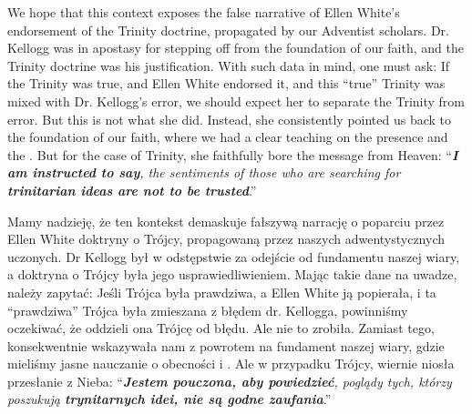 We hope that this context exposes the false narrative of Ellen White's endorsement of the Trinity doctrine, propagated by our Adventist scholars. Dr. Kellogg was in apostasy for stepping off from the foundation of our faith, and the Trinity doctrine was his justification. With such data in mind, one must ask: If the Trinity was true, and Ellen White endorsed it, and this “true” Trinity was mixed with Dr. Kellogg's error, we should expect her to separate the Trinity from error. But this is not what she did. Instead, she consistently pointed us back to the foundation of our faith, where we had a clear teaching on the presence and the . But for the case of Trinity, she faithfully bore the message from Heaven: “\textit{\textbf{I am instructed to say}, the sentiments of those who are searching for \textbf{trinitarian ideas are not to be trusted}}.”


Mamy nadzieję, że ten kontekst demaskuje fałszywą narrację o poparciu przez Ellen White doktryny o Trójcy, propagowaną przez naszych adwentystycznych uczonych. Dr Kellogg był w odstępstwie za odejście od fundamentu naszej wiary, a doktryna o Trójcy była jego usprawiedliwieniem. Mając takie dane na uwadze, należy zapytać: Jeśli Trójca była prawdziwa, a Ellen White ją popierała, i ta “prawdziwa” Trójca była zmieszana z błędem dr. Kellogga, powinniśmy oczekiwać, że oddzieli ona Trójcę od błędu. Ale nie to zrobiła. Zamiast tego, konsekwentnie wskazywała nam z powrotem na fundament naszej wiary, gdzie mieliśmy jasne nauczanie o obecności i . Ale w przypadku Trójcy, wiernie niosła przesłanie z Nieba: “\textit{\textbf{Jestem pouczona, aby powiedzieć}, poglądy tych, którzy poszukują \textbf{trynitarnych idei, nie są godne zaufania}}.”


